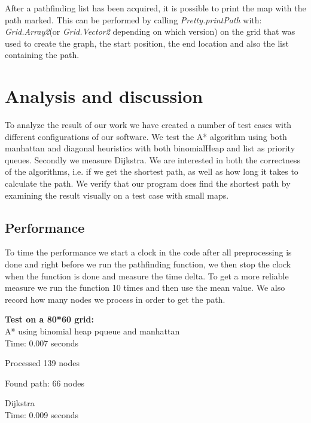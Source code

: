 \documentclass[12pt, a4paper]{article}
\begin{document}
After a pathfinding list has been acquired, it is possible to print the map with the path marked. This can be performed by
calling \textit{Pretty.printPath} with: \textit{Grid.Array2}(or \textit{Grid.Vector2} depending on which version)
on the grid that was used to create the graph, the start position, the end location and also the list containing the path.




\section{Analysis and discussion}

\label{Analysis}

To analyze the result of our work we have created a number of test cases
with different configurations of our software. We test the A* algorithm
using both manhattan and diagonal heuristics with both binomialHeap and
list as priority queues. Secondly we measure Dijkstra. We are interested in
both the correctness of the algorithms, i.e. if we get the shortest path,
as well as how long it takes to calculate the path. We verify that our
program does find the shortest path by examining the result visually on a
test case with small maps.


\subsection{Performance}

To time the performance we start a clock in the code after all
preprocessing is done and right before we run the pathfinding function, we
then stop the clock when the function is done and measure the time delta.
To get a more reliable measure we run the function 10 times and then use
the mean value. We also record how many nodes we process in order to get
the path.


\textbf{Test on a 80*60 grid:}\\

A* using binomial heap pqueue and manhattan\\

Time: 0.007 seconds

Processed 139 nodes

Found path: 66 nodes


Dijkstra\\

Time: 0.009 seconds
\end{document}
